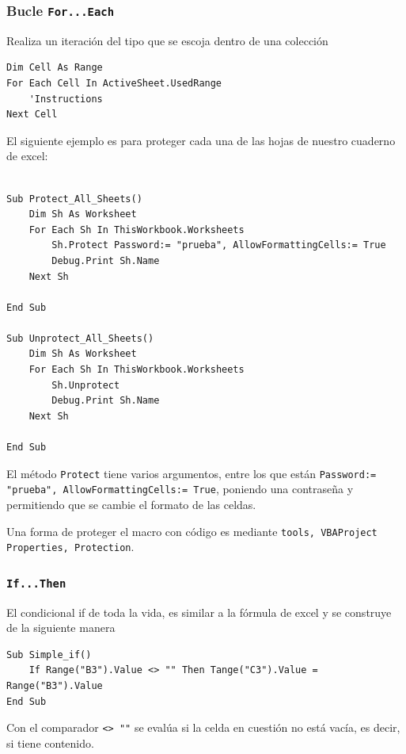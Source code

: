 \subsubsection{Bucle \texttt{For...Each}}


Realiza un iteración del tipo que se escoja dentro de una colección

\begin{verbatim}
Dim Cell As Range
For Each Cell In ActiveSheet.UsedRange
    'Instructions
Next Cell
\end{verbatim}

El siguiente ejemplo es para proteger cada una de las hojas de nuestro cuaderno de excel:

\begin{verbatim}

Sub Protect_All_Sheets()
    Dim Sh As Worksheet
    For Each Sh In ThisWorkbook.Worksheets
        Sh.Protect Password:= "prueba", AllowFormattingCells:= True
        Debug.Print Sh.Name
    Next Sh
    
End Sub

Sub Unprotect_All_Sheets()
    Dim Sh As Worksheet
    For Each Sh In ThisWorkbook.Worksheets
        Sh.Unprotect
        Debug.Print Sh.Name
    Next Sh
    
End Sub
\end{verbatim}

El método \texttt{Protect} tiene varios argumentos, entre los que están \texttt{Password:= "prueba", AllowFormattingCells:= True}, poniendo una contraseña y permitiendo que se cambie el formato de las celdas.

Una forma de proteger el macro con código es mediante \texttt{tools, VBAProject Properties, Protection}.

\subsubsection{\texttt{If...Then}}

El condicional if de toda la vida, es similar a la fórmula de excel y se construye de la siguiente manera

\begin{verbatim}
Sub Simple_if()
    If Range("B3").Value <> "" Then Tange("C3").Value = Range("B3").Value
End Sub    
\end{verbatim}

Con el comparador \texttt{<> ""} se evalúa si la celda en cuestión no está vacía, es decir, si tiene contenido.

